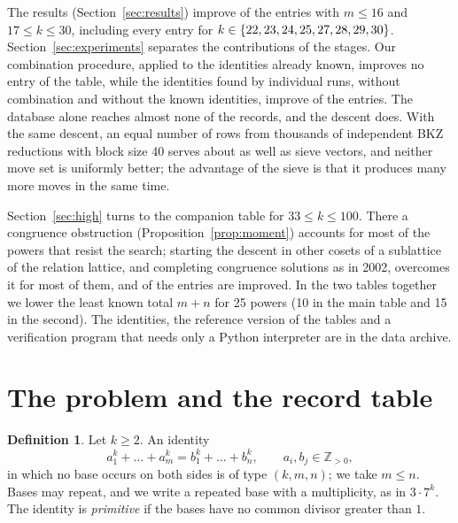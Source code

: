 \documentclass[11pt]{amsart}
\theoremstyle{definition}
\newtheorem{definition}[proposition]{Definition}
\theoremstyle{remark}
\newcommand{\Z}{\mathbb{Z}}
\begin{document}
The results (Section~\ref{sec:results}) improve \NumImproved{} of the \NumCells{} entries with
$m\le16$ and $17\le k\le30$, including every entry for $k\in\{22, 23, 24, 25, 27, 28, 29, 30\}$.
Section~\ref{sec:experiments} separates the contributions of the stages. Our combination
procedure, applied to the identities already known, improves no entry of the table, while the
identities found by individual runs, without combination and without the known identities,
improve \CtrlRImp{} of the \NumImproved{} entries. The database alone reaches almost none of the
records, and the descent does. With the same descent, an equal number of rows from thousands of
independent BKZ reductions with block size 40 serves about as well as sieve vectors, and neither
move set is uniformly better; the advantage of the sieve is that it produces many more moves in
the same time.

Section~\ref{sec:high} turns to the companion table for $33\le k\le100$. There a congruence
obstruction (Proposition~\ref{prop:moment}) accounts for most of the powers that resist the
search; starting the descent in other cosets of a sublattice of the relation lattice, and
completing congruence solutions as in 2002, overcomes it for most of them, and \HNumImproved{}
of the \HNumCells{} entries are improved. In the two tables together we lower the least known
total $m+n$ for 25 powers (10 in the main table and 15 in the second). The identities, the
reference version of the tables and a verification program that needs only a Python interpreter
are in the data archive.

\section{The problem and the record table}\label{sec:problem}

\begin{definition}
Let $k\ge2$. An identity
\[
a_1^k+\dots+a_m^k=b_1^k+\dots+b_n^k,\qquad a_i,b_j\in\Z_{>0},
\]
in which no base occurs on both sides is of type $(k,m,n)$; we take $m\le n$. Bases may
repeat, and we write a repeated base with a multiplicity, as in $3\cdot7^k$. The identity is
\emph{primitive} if the bases have no common divisor greater than $1$.
\end{definition}
\end{document}

